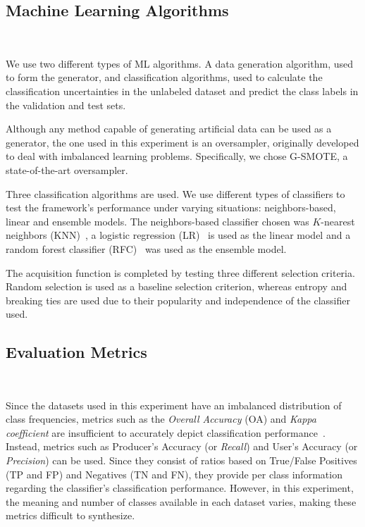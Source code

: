 \documentclass[remotesensing,article,submit,moreauthors,pdftex]{Definitions/mdpi}
\begin{document}
\begin{paracol}{2}
\linenumbers
\switchcolumn

\subsection{Machine Learning Algorithms}~\label{sec:machine_learning_algorithms}

We use two different types of ML algorithms. A data generation algorithm, used
to form the generator, and classification algorithms, used to calculate the
classification uncertainties in the unlabeled dataset and predict the class
labels in the validation and test sets.

Although any method capable of generating artificial data can be used as a
generator, the one used in this experiment is an oversampler, originally
developed to deal with imbalanced learning problems. Specifically, we chose
G-SMOTE, a state-of-the-art oversampler.

Three classification algorithms are used. We use different types of
classifiers to test the framework's performance under varying situations:
neighbors-based, linear and ensemble models. The neighbors-based classifier
chosen was $K$-nearest neighbors (KNN)~\cite{Cover1967}, a logistic regression
(LR)~\cite{Nelder1972} is used as the linear model and a random forest
classifier (RFC)~\cite{Ho1995} was used as the ensemble model.

The acquisition function is completed by testing three different selection
criteria. Random selection is used as a baseline selection criterion, whereas
entropy and breaking ties are used due to their popularity and independence of
the classifier used.

\subsection{Evaluation Metrics}~\label{sec:evaluation_metrics}

Since the datasets used in this experiment have an imbalanced distribution of
class frequencies, metrics such as the \textit{Overall Accuracy} (OA) and
\textit{Kappa coefficient} are insufficient to accurately depict
classification performance~\cite{Olofsson2013, Pontius2011}. Instead, metrics
such as Producer's Accuracy (or \textit{Recall}) and User's Accuracy (or
\textit{Precision}) can be used. Since they consist of ratios based on
True/False Positives (TP and FP) and Negatives (TN and FN), they provide per
class information regarding the classifier's classification performance.
However, in this experiment, the meaning and number of classes available in
each dataset varies, making these metrics difficult to synthesize.


\end{paracol}
\end{document}
